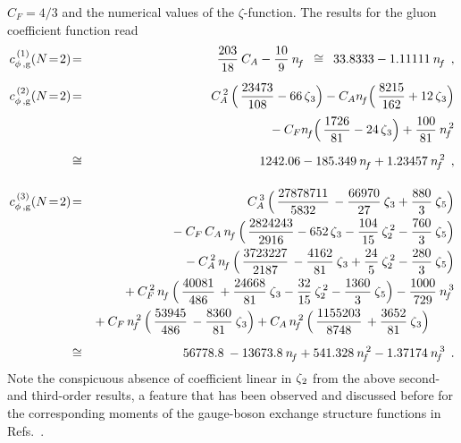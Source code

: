 \documentclass[12pt]{article}
\newcommand{\bea}{\begin{eqnarray}}
\newcommand{\eea}{\end{eqnarray}}
\newcommand{\nn}{\nonumber}
\begin{document}
$C_F=4/3$ and the numerical values of the $\zeta$-function.
%
The results for the gluon coefficient function read
%
\bea
\label{eq:cg1N2}
 c_{\rm \phi\, , g}^{\,(1)} (N\!=\!2) &\! = \! &
          {203 \over 18}\: \*  \ca
        - {10 \over 9}\: \* \nf
 \:\;\cong\:\; 33.8333 - 1.11111\: \nf
 \:\: , \\[2mm]
%
\label{eq:cg2N2}
 c_{\rm \phi\, , g}^{\,(2)} (N\!=\!2) &\! = \! &
         \cas\, \*  \Big( \,
            {23473 \over 108}
          - 66\, \*  \z3
          \Big)
       -  \ca  \*  \nf   \*  \Big( \,
            {8215 \over 162}
          + 12\, \*  \z3
          \Big)
%
%
    \nn \\[1mm] & & \mbox{}
       -  \cf  \*  \nf   \*  \Big( \,
            {1726 \over 81}
          - 24\, \*  \z3
          \Big)
       + {100 \over 81}\: \*  \nfs
 \nn \\[2mm]
 &\!\cong\! &   1242.06 - 185.349\: \nf  + 1.23457\: \nfs
\:\: , \\[4mm] 
%
\label{eq:cg3N2}
 c_{\rm \phi\, , g}^{\,(3)} (N\!=\!2)  &\! = \! &
          \cat\,  \*  \Big( \,
            {27878711 \over 5832}\,
          - {66970 \over 27}\: \*  \z3
          + {880 \over 3}\: \*  \z5
          \Big)
%
%
   \nn \\ & & \mbox{}
       -  \cf\,  \*  \ca\,  \*  \nf\,   \*  \Big( \,
            {2824243 \over 2916}
          - 652\, \*  \z3
          - {104 \over 15}\: \*  \zss
          - {760 \over 3}\: \*  \z5 
          \Big)
%
%
   \nn \\ & & \mbox{}
       -  \cas\, \*  \nf\,   \*  \Big( \,
            {3723227 \over 2187}\,
          - {4162 \over 81}\: \*  \z3
          + {24 \over 5}\: \*  \zss
          - {280 \over 3}\: \*  \z5 
          \Big)
%
%
   \nn \\ & & \mbox{}
       +  \cfs\, \*  \nf\,   \*  \Big( \,
            {40081 \over 486}\,
          + {24668 \over 81}\: \*  \z3 
          - {32 \over 15}\: \*  \zss
          - {1360 \over 3}\: \*  \z5 
          \Big)
       - {1000 \over 729}\: \* \nft
%
%
   \nn \\ & & \mbox{}
       +  \cf\,  \*  \nfs\,  \*  \Big( \,
            {53945 \over 486}\,
          - {8360 \over 81}\: \*  \z3
          \Big)
       +  \ca\,  \*  \nfs\,  \*  \Big( \,
            {1155203 \over 8748}\,
          + {3652 \over 81}\: \*  \z3
          \Big)
 \qquad \nn \\[2mm]
 &\!\cong\! &   56778.8 \: - 13673.8\:\nf + 541.328\: \nfs - 1.37174\: \nft
 \:\: .
\eea
%
Note the conspicuous absence of coefficient linear in ${\zeta_{\:\! 2}}$ from the above 
second- and third-order results, a feature that has been observed and discussed
before for the corresponding moments of the gauge-boson exchange structure 
functions in Refs.~\cite{Mom3loop}.
\end{document}
